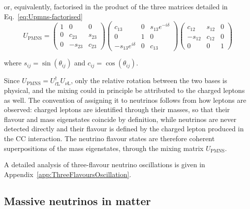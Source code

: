 or, equivalently, factorised in the product of the three matrices detailed in Eq.~\ref{eq:Upmns-factorised}
\begin{equation}
    \label{eq:Upmns-factorised}
    U_{\text{PMNS}} = 
    \begin{pmatrix}
    1 & 0 & 0 \\
    0 & c_{23} & s_{23} \\
    0 & -s_{23} & c_{23}
    \end{pmatrix}
    \begin{pmatrix}
    c_{13} & 0 & s_{13}e^{-i\delta} \\
    0 & 1 & 0 \\
    -s_{13}e^{i\delta} & 0 & c_{13}
    \end{pmatrix}
    \begin{pmatrix}
    c_{12} & s_{12} & 0 \\
    -s_{12} & c_{12} & 0 \\
    0 & 0 & 1
    \end{pmatrix}
\end{equation}

where $s_{ij} = \sin(\theta_{ij})$ and $c_{ij} = \cos(\theta_{ij})$.

Since $U_\text{PMNS} = U_{\ell\text{L}}^\dagger U_{\nu\text{L}}$, only the relative rotation between the two bases is physical, and the mixing could in principle be attributed to the charged leptons as well. The convention of assigning it to neutrinos follows from how leptons are observed: charged leptons are identified through their masses, so that their flavour and mass eigenstates coincide by definition, while neutrinos are never detected directly and their flavour is defined by the charged lepton produced in the \ac{CC} interaction. The neutrino flavour states are therefore coherent superpositions of the mass eigenstates, through the mixing matrix $U_\text{PMNS}$.

A detailed analysis of three-flavour neutrino oscillations is given in Appendix~\ref{app:ThreeFlavoursOscillation}.


\subsection{Massive neutrinos in matter}
\label{subsec:nu-in-matter}

